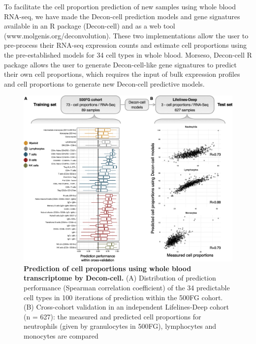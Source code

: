 To facilitate the cell proportion prediction of new samples using whole blood RNA-seq, we have made the Decon-cell prediction models and gene signatures available in an R package (Decon-cell) and as a web tool (www.molgenis.org/deconvolution). These two implementations allow the user to pre-process their RNA-seq expression counts and estimate cell proportions using the pre-established models for 34 cell types in whole blood. Morseso, Decon-cell R package allows the user to generate Decon-cell-like gene signatures to predict their own cell proportions, which requires the input of bulk expression profiles and cell proportions to generate new Decon-cell predictive models.

\begin{figure}[H]
	\includegraphics[width=\textwidth]{chapters/chapter4-deconvolution/img/fig2.png}
	\caption{\textbf{Prediction of cell proportions using whole blood transcriptome by Decon-cell.} (A) Distribution of prediction performance (Spearman correlation coefficient) of the 34 predictable cell types in 100 iterations of prediction within the 500FG cohort. (B) Cross-cohort validation in an independent Lifelines-Deep cohort (n = 627): the measured and predicted cell proportions for neutrophils (given by granulocytes in 500FG), lymphocytes and monocytes are compared}
\end{figure}


